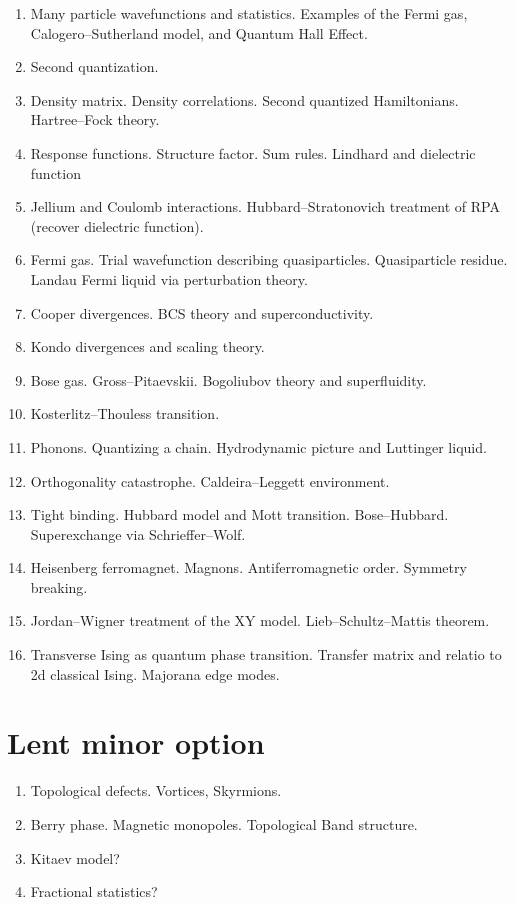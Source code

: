\begin{enumerate}
\item Many particle wavefunctions and statistics. Examples of the Fermi gas, Calogero--Sutherland model, and Quantum Hall Effect.

\item Second quantization. 

\item Density matrix. Density correlations. Second quantized Hamiltonians. Hartree--Fock theory.

\item Response functions. Structure factor. Sum rules. Lindhard and dielectric function

\item Jellium and Coulomb interactions. Hubbard--Stratonovich treatment of RPA (recover dielectric function).

\item Fermi gas. Trial wavefunction describing quasiparticles. Quasiparticle residue. Landau Fermi liquid via perturbation theory. 

\item Cooper divergences. BCS theory and superconductivity. 

\item Kondo divergences and scaling theory.

\item Bose gas. Gross--Pitaevskii. Bogoliubov theory and superfluidity.

\item Kosterlitz--Thouless transition.

\item Phonons. Quantizing a chain. Hydrodynamic picture and Luttinger liquid.

\item Orthogonality catastrophe. Caldeira--Leggett environment.

\item Tight binding. Hubbard model and Mott transition. Bose--Hubbard. Superexchange via Schrieffer--Wolf.

\item Heisenberg ferromagnet. Magnons. Antiferromagnetic order. Symmetry breaking.

\item Jordan--Wigner treatment of the XY model. Lieb--Schultz--Mattis theorem.

\item Transverse Ising as quantum phase transition. Transfer matrix and relatio to 2d classical Ising. Majorana edge modes.

\end{enumerate}

\section{Lent minor option}


\begin{enumerate}

\item Topological defects. Vortices, Skyrmions. 

\item Berry phase. Magnetic monopoles. Topological Band structure.

\item Kitaev model?

\item Fractional statistics?
\end{enumerate}